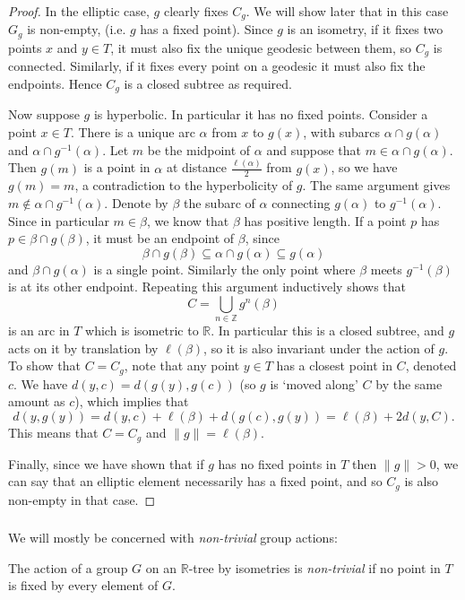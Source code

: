 \begin{proof}
    In the elliptic case, $g$ clearly fixes $C_g$. We will show later that in this case $G_g$ is non-empty, (i.e. $g$ has a fixed point). Since $g$ is an isometry, if it fixes two points $x$ and $y\in T$, it must also fix the unique geodesic between them, so $C_g$ is connected. Similarly, if it fixes every point on a geodesic it must also fix the endpoints. Hence $C_g$ is a closed subtree as required.

    Now suppose $g$ is hyperbolic. In particular it has no fixed points. Consider a point $x\in T$. There is a unique arc $\alpha$ from $x$ to $g(x)$, with subarcs $\alpha \cap g(\alpha)$ and $\alpha \cap g^{-1}(\alpha)$. Let $m$ be the midpoint of $\alpha$ and suppose that $m\in \alpha \cap g(\alpha)$. Then $g(m)$ is a point in $\alpha$ at distance $\frac{\ell(\alpha)}{2}$ from $g(x)$, so we have $g(m)=m$, a contradiction to the hyperbolicity of $g$. The same argument gives $m\notin \alpha \cap g^{-1}(\alpha)$. Denote by $\beta$ the subarc of $\alpha$ connecting $g(\alpha)$ to $g^{-1}(\alpha)$. Since in particular $m\in \beta$, we know that $\beta$ has positive length. If a point $p$ has $p\in \beta \cap g(\beta)$, it must be an endpoint of $\beta$, since \[\beta\cap g(\beta)\subseteq\alpha\cap g(\alpha)\subseteq g(\alpha)\] and $\beta\cap g(\alpha)$ is a single point. Similarly the only point where $\beta$ meets $g^{-1}(\beta)$ is at its other endpoint. Repeating this argument inductively shows that \[C=\underset{n\in\mathbb{Z}}{\bigcup}g^n(\beta)\] is an arc in $T$ which is isometric to $\mathbb{R}$. In particular this is a closed subtree, and $g$ acts on it by translation by $\ell(\beta)$, so it is also invariant under the action of $g$. To show that $C=C_g$, note that any point $y\in T$ has a closest point in $C$, denoted $c$. We have $d(y,c)=d(g(y),g(c))$ (so $g$ is `moved along' %
    $C$ by the same amount as $c$), which implies that \[d(y,g(y))=d(y,c)+\ell(\beta)+d(g(c),g(y))=\ell(\beta)+2d(y,C).\] This means that $C=C_g$ and $\lVert g\rVert=\ell(\beta)$.

    Finally, since we have shown that if $g$ has no fixed points in $T$ then $\lVert g\rVert>0$, we can say that an elliptic element necessarily has a fixed point, and so $C_g$ is also non-empty in that case.
\end{proof}
\subsubsection{}
We will mostly be concerned with \textit{non-trivial} group actions:
\begin{definition}
    The action of a group $G$ on an $\mathbb{R}$-tree by isometries is \emph{non-trivial} if no point in $T$ is fixed by every element of $G$.
\end{definition}

